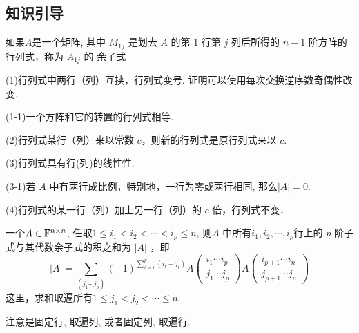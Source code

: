 \subsection{知识引导}

 如果$A$是一个矩阵, 其中 $M_{1j}$ 是划去 $A$ 的第 $1$ 行第 $j$ 列后所得的 $n-1$ 阶方阵的行列式，称为 $A_{1j}$ 的 余子式


(1)行列式中两行（列）互挟，行列式变号. 证明可以使用每次交换逆序数奇偶性改变.

(1-1)一个方阵和它的转置的行列式相等. 

(2)行列式某行（列）来以常数 $c$，则新的行列式是原行列式来以 $c$.

(3)行列式具有行(列)的线性性. 

(3-1)若 $A$ 中有两行成比例，特别地，一行为零或两行相同, 那么$|A|=0$.

(4)行列式的某一行（列）加上另一行（列）的 $c$ 倍，行列式不变．


一个$A\in\mathbb{F}^{n\times n}$, 任取$1\leq i_1<i_2<\cdots<i_p\leq n$, 则$A$ 中所有$i_1,i_2, \cdots ,i_p$行上的 $p$ 阶子式与其代数余子式的积之和为 $|A|$ ，即
$$
|A|=\sum_{\left(j_{1} \cdots j_{p}\right)}(-1)^{\sum_{t=1}^{p}\left(i_{t}+j_{t}\right)} A\left(\begin{array}{l}
    i_{1} \cdots i_{p} \\
    j_{1} \cdots j_{p}
    \end{array}\right) A\left(\begin{array}{l}
    i_{p+1} \cdots i_{n} \\
    j_{p+1} \cdots j_{n}
    \end{array}\right)
$$
这里，求和取遍所有$1\leq j_1<j_2<\cdots\leq n$. 

注意是固定行, 取遍列, 或者固定列, 取遍行. 